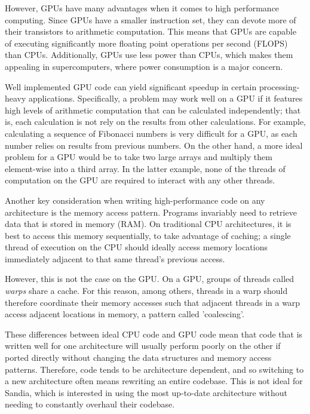 However, GPUs have many advantages when it comes to high performance computing.
Since GPUs have a smaller instruction set, they can devote more of their
transistors to arithmetic computation. This means that GPUs are capable of
executing significantly more floating point operations per second (FLOPS) than
CPUs.  Additionally, GPUs use less power than CPUs, which makes them appealing
in supercomputers, where power consumption is a major concern.

Well implemented GPU code can yield significant speedup in certain
processing-heavy applications. Specifically, a problem may work well on a GPU if
it features high levels of arithmetic computation that can be calculated
independently; that is, each calculation is not rely on the results from other
calculations. For example, calculating a sequence of Fibonacci numbers is very
difficult for a GPU, as each number relies on results from previous numbers. On
the other hand, a more ideal problem for a GPU would be to take two large arrays
and multiply them element-wise into a third array.  In the latter example, none
of the threads of computation on the GPU are required to interact with any other
threads.

Another key consideration when writing high-performance code on any architecture
is the memory access pattern.  Programs invariably need to retrieve data that is
stored in memory (RAM). On traditional CPU architectures, it is best to access
this memory sequentially, to take advantage of caching; a single thread of
execution on the CPU should ideally access memory locations immediately adjacent
to that same thread's previous access.

However, this is not the case on the GPU. On a GPU, groups of threads called
\emph{warps} share a cache. For this reason, among others, threads in a warp
should therefore coordinate their memory accesses such that adjacent threads in
a warp access adjacent locations in memory, a pattern called 'coalescing'.

These differences between ideal CPU code and GPU code mean that code that is
written well for one architecture will usually perform poorly on the other if
ported directly without changing the data structures and memory access patterns.
Therefore, code tends to be architecture dependent, and so switching to a new
architecture often means rewriting an entire codebase. This is not ideal for
Sandia, which is interested in using the most up-to-date architecture without
needing to constantly overhaul their codebase.

